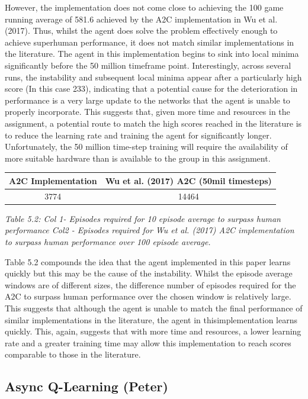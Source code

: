 \documentclass{article}
\begin{document}
However, the implementation does not come close to achieving the 100 game running average of 581.6 achieved by the A2C implementation in Wu et al. (2017). Thus, whilst the agent does solve the problem effectively enough to achieve superhuman performance, it does not match similar implementations in the literature. The agent in this implementation begins to sink into local minima significantly before the 50 million timeframe point. Interestingly, across several runs, the instability and subsequent local minima appear after a particularly high score (In this case 233), indicating that a potential cause for the deterioration in performance is a very large update to the networks that the agent is unable to properly incorporate. This suggests that, given more time and resources in the assignment, a potential route to match the high scores reached in the literature is to reduce the learning rate and training the agent for significantly longer. Unfortunately, the 50 million time-step training will require the availability of more suitable hardware than is available to the group in this assignment.

\begin{table}[h!]
\centering
\begin{tabular}{|c | c|} 
 \hline
 A2C Implementation & Wu et al. (2017) A2C (50mil timesteps) \\ [0.5ex] 
 \hline
 3774 & 14464   \\ 
 \hline
\end{tabular}
\end{table}
\emph{Table 5.2: Col 1- Episodes required for 10 episode average to surpass human performance Col2 - Episodes required for Wu et al. (2017) A2C implementation to surpass human performance over 100 episode average.}

Table 5.2 compounds the idea that the agent implemented in this paper learns quickly but this may be the cause of the instability. Whilst the episode average windows are of different sizes, the difference number of episodes required for the A2C to surpass human performance over the chosen window is relatively large. This suggests that although the agent is unable to match the final performance of similar implementations in the literature, the agent in thisimplementation learns quickly. This, again, suggests that with more time and resources, a lower learning rate and a greater training time may allow this implementation to reach scores comparable to those in the literature.

\subsection{Async Q-Learning (Peter)}
\end{document}
